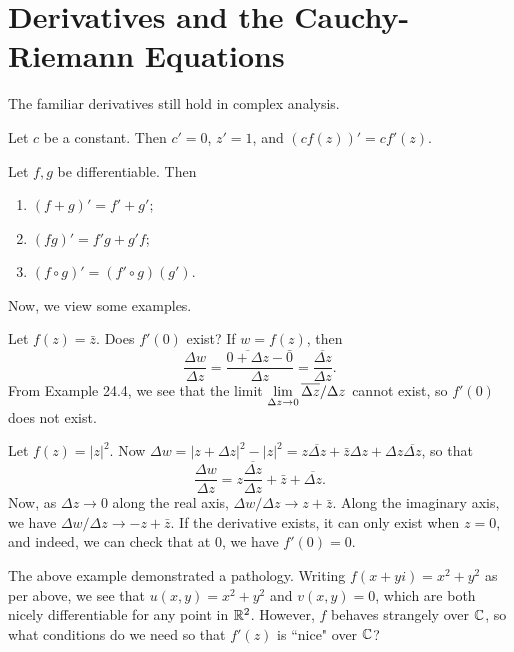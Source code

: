 \documentclass{article}
\begin{document}
\section{Derivatives and the Cauchy-Riemann Equations}
The familiar derivatives still hold in complex analysis.
\begin{proposition}
Let $c$ be a constant. Then $c' = 0$, $z' = 1$, and $(cf(z))' = cf'(z)$.
\end{proposition}
\begin{proposition}
Let $f, g$ be differentiable. Then
\begin{enumerate}
    \item $(f+g)' = f'+g'$;
    \item $(fg)' = f'g + g'f$;
    \item $(f\circ g)' = (f'\circ g)(g')$.
\end{enumerate}
\end{proposition}
Now, we view some examples.
\begin{example}
Let $f(z) = \bar z$. Does $f'(0)$ exist? If $w = f(z)$, then
$$\frac{\Delta w}{\Delta z} = \frac{\overline{0 + \Delta z} -\bar 0}{\Delta z} = \frac{\overline{\Delta z}}{\Delta z}.$$
From Example 24.4, we see that the limit $\displaystyle\lim_{\Delta z\to 0}\overline{\Delta z}/\Delta z$ cannot exist, so $f'(0)$ does not exist.
\end{example}
\begin{example}
Let $f(z) = |z|^2$. Now $\Delta w = |z+\Delta z|^2 - |z|^2 = z\overline{\Delta z} + \bar z\Delta z + \Delta z\overline{\Delta z}$, so that $$\frac{\Delta w}{\Delta z} = z\frac{ \overline{\Delta z}}{\Delta z} + \bar z + \overline{\Delta z}.$$
Now, as $\Delta z\to 0$ along the real axis, $\Delta w/\Delta z\to z+\bar z$. Along the imaginary axis, we have $\Delta w/\Delta z \to -z+\bar z$. If the derivative exists, it can only exist when $z=0$, and indeed, we can check that at $0$, we have $f'(0)= 0$.
\end{example}
The above example demonstrated a pathology. Writing $f(x+yi) = x^2+y^2$ as per above, we see that $u(x,y) = x^2+y^2$ and $v(x,y) = 0$, which are both nicely differentiable for any point in $\mathbb R^2$. However, $f$ behaves strangely over $\mathbb C$, so what conditions do we need so that $f'(z)$ is ``nice" over $\mathbb C$?
\end{document}
